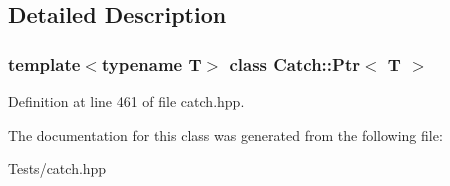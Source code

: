 \subsection{Detailed Description}
\subsubsection*{template$<$typename T$>$\newline
class Catch\+::\+Ptr$<$ T $>$}



Definition at line 461 of file catch.\+hpp.



The documentation for this class was generated from the following file\+:\begin{DoxyCompactItemize}
\item 
Tests/catch.\+hpp\end{DoxyCompactItemize}
